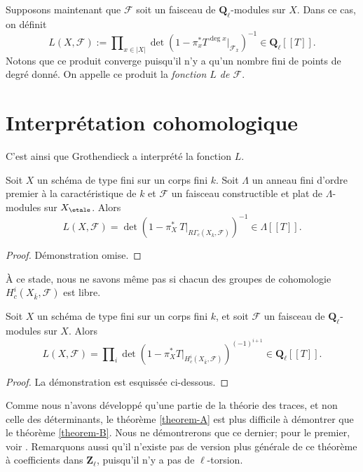 \begin{definition}
\label{definition-L-function-l-adic}
Supposons maintenant que $\mathcal{F}$ soit un faisceau de $\mathbf{Q}_\ell$-modules sur $X$.
Dans ce cas, on définit
$$
L(X, \mathcal{F}) :=
\prod\nolimits_{x \in |X|}
\det(1 - \pi_x^*T^{\deg x} |_{\mathcal{F}_{\bar x}})^{-1}
\in \mathbf{Q}_\ell[[T]].
$$
Notons que ce produit converge puisqu'il n'y a qu'un nombre fini de points de
degré donné. On appelle ce produit la {\it fonction $L$ de
$\mathcal{F}$}.
\end{definition}




\section{Interprétation cohomologique}
\label{section-L-cohomological}

\noindent
C'est ainsi que Grothendieck a interprété la fonction $L$.

\begin{theorem}
\label{theorem-A}
Soit $X$ un schéma de type fini sur un corps fini $k$. Soit $\Lambda$ un
anneau fini d'ordre premier à la caractéristique de $k$ et $\mathcal{F}$ un
faisceau constructible et plat de $\Lambda$-modules sur $X_\etale$. Alors
$$
L(X, \mathcal{F}) =
\det(1 - \pi_X^*\ T |_{R\Gamma_c(X_{\bar k}, \mathcal{F})})^{-1}
\in \Lambda[[T]].
$$
\end{theorem}

\begin{proof}
Démonstration omise.
\end{proof}

\noindent
À ce stade, nous ne savons même pas si chacun des groupes de cohomologie
$H^i_c(X_{\bar k}, \mathcal{F})$ est libre.

\begin{theorem}
\label{theorem-B}
Soit $X$ un schéma de type fini sur un corps fini $k$, et soit $\mathcal{F}$ un
faisceau de $\mathbf{Q}_\ell$-modules sur $X$. Alors
$$
L(X, \mathcal{F}) =
\prod\nolimits_i
\det(1 - \pi_X^*T |_{H_c^i(X_{\bar k} , \mathcal{F})})^{(-1)^{i + 1}}
\in \mathbf{Q}_\ell[[T]].
$$
\end{theorem}

\begin{proof}
La démonstration est esquissée ci-dessous.
\end{proof}

\begin{remark}
\label{remark-which-is-harder}
Comme nous n'avons développé qu'une partie de la théorie des traces, et non
celle des déterminants, le théorème \ref{theorem-A}
est plus difficile à démontrer que le
théorème \ref{theorem-B}.
Nous ne démontrerons que ce dernier; pour le premier, voir \cite{SGA4.5}.
Remarquons aussi qu'il n'existe pas de version plus générale de ce théorème à
coefficients dans $\mathbf{Z}_\ell$, puisqu'il n'y a pas de $\ell$-torsion.
\end{remark}

